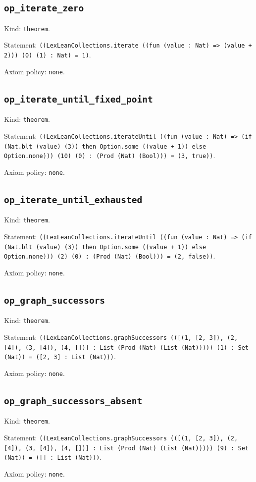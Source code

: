 \documentclass[11pt]{article}
\begin{document}
\subsection*{\texttt{op\_iterate\_zero}}
\noindent Kind: \texttt{theorem}.\par
\noindent Statement: \texttt{((LexLeanCollections.iterate ((fun (value : Nat) => (value + 2))) (0) (1) : Nat) = 1)}.\par
\noindent Axiom policy: \texttt{none}.\par
\subsection*{\texttt{op\_iterate\_until\_fixed\_point}}
\noindent Kind: \texttt{theorem}.\par
\noindent Statement: \texttt{((LexLeanCollections.iterateUntil ((fun (value : Nat) => (if (Nat.blt (value) (3)) then Option.some ((value + 1)) else Option.none))) (10) (0) : (Prod (Nat) (Bool))) = (3, true))}.\par
\noindent Axiom policy: \texttt{none}.\par
\subsection*{\texttt{op\_iterate\_until\_exhausted}}
\noindent Kind: \texttt{theorem}.\par
\noindent Statement: \texttt{((LexLeanCollections.iterateUntil ((fun (value : Nat) => (if (Nat.blt (value) (3)) then Option.some ((value + 1)) else Option.none))) (2) (0) : (Prod (Nat) (Bool))) = (2, false))}.\par
\noindent Axiom policy: \texttt{none}.\par
\subsection*{\texttt{op\_graph\_successors}}
\noindent Kind: \texttt{theorem}.\par
\noindent Statement: \texttt{((LexLeanCollections.graphSuccessors (([(1, [2, 3]), (2, [4]), (3, [4]), (4, [])] : List (Prod (Nat) (List (Nat))))) (1) : Set (Nat)) = ([2, 3] : List (Nat)))}.\par
\noindent Axiom policy: \texttt{none}.\par
\subsection*{\texttt{op\_graph\_successors\_absent}}
\noindent Kind: \texttt{theorem}.\par
\noindent Statement: \texttt{((LexLeanCollections.graphSuccessors (([(1, [2, 3]), (2, [4]), (3, [4]), (4, [])] : List (Prod (Nat) (List (Nat))))) (9) : Set (Nat)) = ([] : List (Nat)))}.\par
\noindent Axiom policy: \texttt{none}.\par
\end{document}
